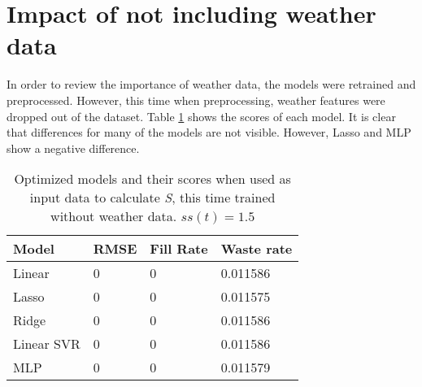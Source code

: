 \documentclass[final,authoryear,5p,times,twocolumn, 11pt]{elsarticle}
\begin{document}
\section{Impact of not including weather data}
\label{sec:noweather}
In order to review the importance of weather data, the models were retrained and preprocessed. However, this time when preprocessing, weather features were dropped out of the dataset. Table \ref{tab:noweather} shows the scores of each model. It is clear that differences for many of the models are not visible. However, Lasso and MLP show a negative difference.
\begin{table}[!h]
	\begin{tabular}{>{\raggedright}p{}p{}p{}p{}}
		\hline
		Model                & RMSE & Fill Rate & Waste rate \\ \hline
		Linear    & 0    & 0         & 0.011586   \\
		Lasso     & 0    & 0         & 0.011575   \\
		Ridge     & 0    & 0         & 0.011586   \\
		Linear SVR & 0    & 0         & 0.011586   \\
		MLP       & 0    & 0         & 0.011579   \\ \hline
	\end{tabular}
	\caption{Optimized models and their scores when used as input data to calculate \textit{S}, this time trained without weather data. $ss(t)=1.5$}
	\label{tab:noweather}
\end{table}
\end{document}
